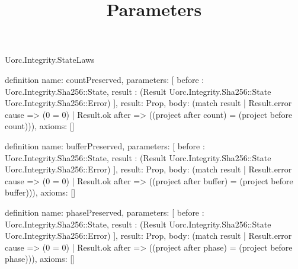 \begin{lexlean}{Uorc.Integrity.StateLaws}
\title{Parameters}
\begin{semanticmodule}
definition{
  name: countPreserved,
  parameters: [
    before : Uorc.Integrity.Sha256::State,
    result : (Result Uorc.Integrity.Sha256::State Uorc.Integrity.Sha256::Error)
  ],
  result: Prop,
  body: (match result
    | Result.error cause => (0 = 0)
    | Result.ok after => ((project after count) = (project before count))),
  axioms: []
}

definition{
  name: bufferPreserved,
  parameters: [
    before : Uorc.Integrity.Sha256::State,
    result : (Result Uorc.Integrity.Sha256::State Uorc.Integrity.Sha256::Error)
  ],
  result: Prop,
  body: (match result
    | Result.error cause => (0 = 0)
    | Result.ok after => ((project after buffer) = (project before buffer))),
  axioms: []
}

definition{
  name: phasePreserved,
  parameters: [
    before : Uorc.Integrity.Sha256::State,
    result : (Result Uorc.Integrity.Sha256::State Uorc.Integrity.Sha256::Error)
  ],
  result: Prop,
  body: (match result
    | Result.error cause => (0 = 0)
    | Result.ok after => ((project after phase) = (project before phase))),
  axioms: []
}


\end{semanticmodule}
\end{lexlean}
